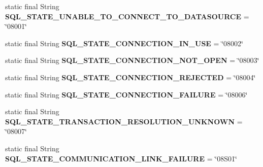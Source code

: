 \begin{DoxyCompactItemize}
static final String {\bfseries S\+Q\+L\+\_\+\+S\+T\+A\+T\+E\+\_\+\+U\+N\+A\+B\+L\+E\+\_\+\+T\+O\+\_\+\+C\+O\+N\+N\+E\+C\+T\+\_\+\+T\+O\+\_\+\+D\+A\+T\+A\+S\+O\+U\+R\+CE} = \char`\"{}08001\char`\"{}
\item 
\mbox{\label{classcom_1_1mysql_1_1jdbc_1_1_s_q_l_error_aeb6ba3094abf64b36dad193431354a90}} 
static final String {\bfseries S\+Q\+L\+\_\+\+S\+T\+A\+T\+E\+\_\+\+C\+O\+N\+N\+E\+C\+T\+I\+O\+N\+\_\+\+I\+N\+\_\+\+U\+SE} = \char`\"{}08002\char`\"{}
\item 
\mbox{\label{classcom_1_1mysql_1_1jdbc_1_1_s_q_l_error_a02c73565816c034ad5d8d64d718cb1a4}} 
static final String {\bfseries S\+Q\+L\+\_\+\+S\+T\+A\+T\+E\+\_\+\+C\+O\+N\+N\+E\+C\+T\+I\+O\+N\+\_\+\+N\+O\+T\+\_\+\+O\+P\+EN} = \char`\"{}08003\char`\"{}
\item 
\mbox{\label{classcom_1_1mysql_1_1jdbc_1_1_s_q_l_error_aed814d55f77041a22d4c709da2a6e3a1}} 
static final String {\bfseries S\+Q\+L\+\_\+\+S\+T\+A\+T\+E\+\_\+\+C\+O\+N\+N\+E\+C\+T\+I\+O\+N\+\_\+\+R\+E\+J\+E\+C\+T\+ED} = \char`\"{}08004\char`\"{}
\item 
\mbox{\label{classcom_1_1mysql_1_1jdbc_1_1_s_q_l_error_af0165409326e46dca99cc158302129a1}} 
static final String {\bfseries S\+Q\+L\+\_\+\+S\+T\+A\+T\+E\+\_\+\+C\+O\+N\+N\+E\+C\+T\+I\+O\+N\+\_\+\+F\+A\+I\+L\+U\+RE} = \char`\"{}08006\char`\"{}
\item 
\mbox{\label{classcom_1_1mysql_1_1jdbc_1_1_s_q_l_error_adfa21ec4441a2b237980d32a6c4df71e}} 
static final String {\bfseries S\+Q\+L\+\_\+\+S\+T\+A\+T\+E\+\_\+\+T\+R\+A\+N\+S\+A\+C\+T\+I\+O\+N\+\_\+\+R\+E\+S\+O\+L\+U\+T\+I\+O\+N\+\_\+\+U\+N\+K\+N\+O\+WN} = \char`\"{}08007\char`\"{}
\item 
\mbox{\label{classcom_1_1mysql_1_1jdbc_1_1_s_q_l_error_a1c090a4129f856456e1da545f74514a2}} 
static final String {\bfseries S\+Q\+L\+\_\+\+S\+T\+A\+T\+E\+\_\+\+C\+O\+M\+M\+U\+N\+I\+C\+A\+T\+I\+O\+N\+\_\+\+L\+I\+N\+K\+\_\+\+F\+A\+I\+L\+U\+RE} = \char`\"{}08\+S01\char`\"{}
\item 
\mbox{\label{classcom_1_1mysql_1_1jdbc_1_1_s_q_l_error_a9bace3bc0eb9d4d75a24196cb17a0546}} 

\end{DoxyCompactItemize}
